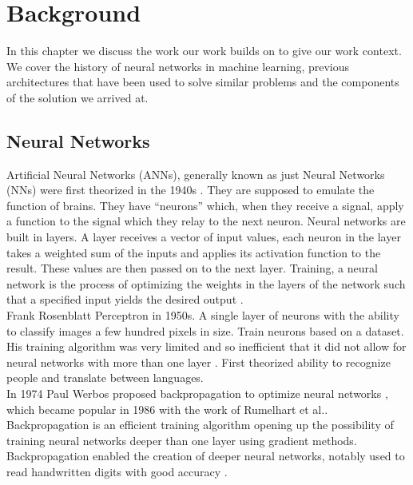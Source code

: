 \chapter{Background\label{cha:background}}
In this chapter we discuss the work our work builds on to give our work context. We cover the history of neural networks in machine learning, previous architectures that have been used to solve similar problems and the components of the solution we arrived at.  

\section{Neural Networks}
Artificial Neural Networks (ANNs), generally known as just Neural Networks (NNs) were first theorized in the 1940s \cite{mcculloch_logical_1943}. They are supposed to emulate the function of brains. They have \enquote{neurons} which, when they receive a signal, apply a function to the signal which they relay to the next neuron. Neural networks are built in layers. A layer receives a vector of input values, each neuron in the layer takes a weighted sum of the inputs and applies its activation function to the result. These values are then passed on to the next layer. Training, a neural network is the process of optimizing the weights in the layers of the network such that a specified input yields the desired output \cite{goodfellow_deep_2016}.\\
Frank Rosenblatt Perceptron in 1950s. A single layer of neurons with the ability to classify images a few hundred pixels in size. Train neurons based on a dataset. His training algorithm was very limited and so inefficient that it did not allow for neural networks with more than one layer \cite{rosenblatt_perceptron_1958}. First theorized ability to recognize people and translate between languages.\\
In 1974 Paul Werbos proposed backpropagation to optimize neural networks \cite{Werbos:74}, which became popular in 1986  with the work of Rumelhart et al..  Backpropagation is an efficient training algorithm opening up the possibility of training neural networks deeper than one layer using gradient methods\cite{noauthor_backpropagation_2022}. Backpropagation enabled the creation of deeper neural networks, notably used to read handwritten digits with good accuracy \cite{lecun_backpropagation_1989}.\\
